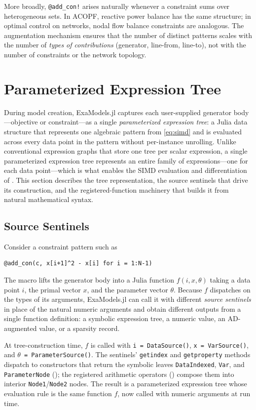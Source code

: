 \documentclass[11pt]{article}
\begin{document}
More broadly, \texttt{@add\_con!} arises naturally whenever a constraint sums over heterogeneous sets. In ACOPF, reactive power balance has the same structure; in optimal control on networks, nodal flow balance constraints are analogous. The augmentation mechanism ensures that the number of distinct patterns scales with the number of \emph{types of contributions} (generator, line-from, line-to), not with the number of constraints or the network topology.

\section{Parameterized Expression Tree}
\label{sec:graph}

During model creation, ExaModels.jl captures each user-supplied generator body---objective or constraint---as a single \emph{parameterized expression tree}: a Julia data structure that represents one algebraic pattern from \cref{eq:simd} and is evaluated across every data point in the pattern without per-instance unrolling. Unlike conventional expression graphs that store one tree per scalar expression, a single parameterized expression tree represents an entire family of expressions---one for each data point---which is what enables the SIMD evaluation and differentiation of . This section describes the tree representation, the source sentinels that drive its construction, and the registered-function machinery that builds it from natural mathematical syntax.

\subsection{Source Sentinels}
\label{sec:graph:sources}

Consider a constraint pattern such as
\begin{lstlisting}
@add_con(c, x[i+1]^2 - x[i] for i = 1:N-1)
\end{lstlisting}
The macro lifts the generator body into a Julia function $f(i, x, \theta)$ taking a data point $i$, the primal vector $x$, and the parameter vector $\theta$. Because $f$ dispatches on the types of its arguments, ExaModels.jl can call it with different \emph{source sentinels} in place of the natural numeric arguments and obtain different outputs from a single function definition: a symbolic expression tree, a numeric value, an AD-augmented value, or a sparsity record.

At tree-construction time, $f$ is called with \texttt{i = DataSource()}, \texttt{x = VarSource()}, and \texttt{$\theta$ = ParameterSource()}. The sentinels' \texttt{getindex} and \texttt{getproperty} methods dispatch to constructors that return the symbolic leaves \texttt{DataIndexed}, \texttt{Var}, and \texttt{ParameterNode} (); the registered arithmetic operators () compose them into interior \texttt{Node1}/\texttt{Node2} nodes. The result is a parameterized expression tree whose evaluation rule is the same function $f$, now called with numeric arguments at run time.
\end{document}
